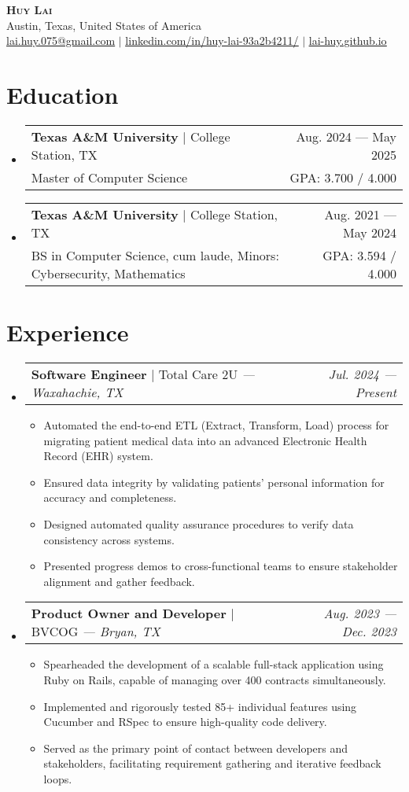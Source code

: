 \documentclass[letterpaper,12pt]{article}
\makeatletter
\newcommand{\resumeItem}[1]{
  \item\small{
    {#1 \vspace{-2pt}}
  }
}
\newcommand{\resumeDegreeheading}[5]{
  \vspace{-2pt}\item
    \begin{tabular*}{0.97\textwidth}[t]{l@{\extracolsep{\fill}}r}
      \textbf{#1} $|$ #2 & #3 \\
      \small#4 & GPA: \small #5 / 4.000 \\
    \end{tabular*}\vspace{-7pt}
}
\newcommand{\resumeSubheading}[4]{
  \vspace{-2pt}\item
    \begin{tabular*}{0.97\textwidth}[t]{l@{\extracolsep{\fill}}r}
      \textbf{#1} $|$ #2 \textit{--- #3} & \textit{#4} \\
    \end{tabular*}\vspace{-7pt}
}
\newcommand{\resumeSubHeadingListStart}{\begin{itemize}[leftmargin=0pt, label={}]}
\newcommand{\resumeSubHeadingListEnd}{\end{itemize}}
\newcommand{\resumeItemListStart}{\begin{itemize}[leftmargin=10pt]}
\newcommand{\resumeItemListEnd}{\end{itemize}\vspace{-10pt}}
\makeatother
\begin{document}
\begin{center}
    \textbf{\Huge \scshape Huy Lai} \\ \vspace{1pt}
    \small{Austin, Texas, United States of America} \\
    \small \href{mailto:lai.huy.075@gmail.com}{\underline{lai.huy.075@gmail.com}} $|$
    \href{https://www.linkedin.com/in/huy-lai-93a2b4211/}{\underline{linkedin.com/in/huy-lai-93a2b4211/}} $|$
    \href{https://lai-huy.github.io}{\underline{lai-huy.github.io}}
\end{center}


\vspace{-12pt}
\section{Education}
  \resumeSubHeadingListStart
    \resumeDegreeheading
      {Texas A\&M University}{College Station, TX}
      {Aug. 2024 --- May 2025}{Master of Computer Science}
      {3.700}
  
    \resumeDegreeheading
      {Texas A\&M University}{College Station, TX}
      {Aug. 2021 --- May 2024}{BS in Computer Science, cum laude, Minors: Cybersecurity, Mathematics}
      {3.594}
      
  \resumeSubHeadingListEnd

\vspace{-16pt}
\section{Experience}
  \resumeSubHeadingListStart
    \resumeSubheading
      {Software Engineer}{Total Care 2U}
      {Waxahachie, TX}{Jul. 2024 --- Present}
      \resumeItemListStart
        \resumeItem{Automated the end-to-end ETL (Extract, Transform, Load) process for migrating patient medical data into an advanced Electronic Health Record (EHR) system.}
        \resumeItem{Ensured data integrity by validating patients' personal information for accuracy and completeness.}
        \resumeItem{Designed automated quality assurance procedures to verify data consistency across systems.}
        \resumeItem{Presented progress demos to cross-functional teams to ensure stakeholder alignment and gather feedback.}
    \resumeItemListEnd

    \resumeSubheading
      {Product Owner and Developer}{BVCOG}
      {Bryan, TX}{Aug. 2023 --- Dec. 2023}
      \resumeItemListStart
        \resumeItem{Spearheaded the development of a scalable full-stack application using Ruby on Rails, capable of managing over 400 contracts simultaneously.}
        \resumeItem{Implemented and rigorously tested 85+ individual features using Cucumber and RSpec to ensure high-quality code delivery.}
        \resumeItem{Served as the primary point of contact between developers and stakeholders, facilitating requirement gathering and iterative feedback loops.}
      \resumeItemListEnd
  \resumeSubHeadingListEnd
\end{document}
